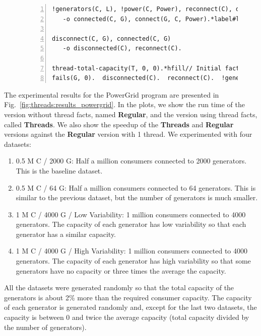 \begin{figure}[h!]
\begin{Verbatim}[numbers=left,fontsize=\scriptsize,commandchars=*\#\&]
!generators(C, L), !power(C, Power), reconnect(C), disconnected(C), G = nth(L, randint(num-generators))*label#line:threads:pgt_conn1&
   -o connected(C, G), connect(G, C, Power).*label#line:threads:pgt_conn2&

disconnect(C, G), connected(C, G)
   -o disconnected(C), reconnect(C).

thread-total-capacity(T, 0, 0).*hfill// Initial facts
fails(G, 0).  disconnected(C).  reconnect(C).  !generators(C, all-generators).  start(G).
\end{Verbatim}
\label{code:threads:powergridt}
\end{figure}

The experimental results for the PowerGrid program are presented in
Fig.~\ref{fig:threads:results_powergrid}. In the plots, we show the run time of
the version without thread facts, named \textbf{Regular}, and the version using
thread facts, called \textbf{Threads}. We also show the speedup of the
\textbf{Threads} and \textbf{Regular} versions against the \textbf{Regular}
version with 1 thread.  We experimented with four datasets:

\begin{enumerate}
      \item 0.5 M C / 2000 G: Half a million consumers connected to 2000
         generators. This is the baseline dataset.

      \item 0.5 M C / 64 G: Half a million consumers connected to 64
         generators. This is similar to the previous dataset, but the number of
         generators is much smaller.

      \item 1 M C / 4000 G / Low Variability: 1 million consumers connected to
         4000 generators. The capacity of each generator has low variability so
         that each generator has a similar capacity.

      \item 1 M C / 4000 G / High Variability: 1 million consumers connected to
         4000 generators. The capacity of each generator has high variability so
         that some generators have no capacity or three times the average the
         capacity.

\end{enumerate}

All the datasets were generated randomly so that the total capacity of the
generators is about 2\% more than the required consumer capacity. The capacity
of each generator is generated randomly and, except for the last two datasets,
the capacity is between 0 and twice the average capacity (total capacity divided
by the number of generators).

